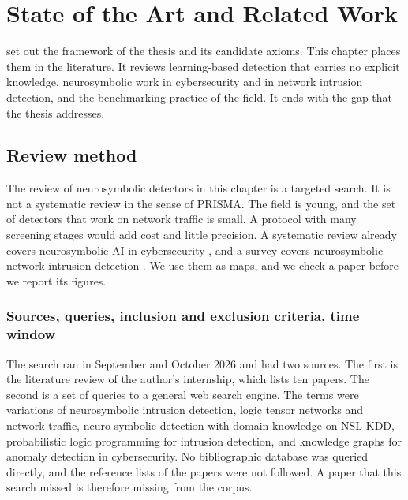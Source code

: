 \chapter{State of the Art and Related Work}
\label{ch:related-work}

 set out the framework of the thesis and its candidate axioms. This
chapter places them in the literature. It reviews learning-based
detection that carries no explicit knowledge, neurosymbolic work in
cybersecurity and in network intrusion detection, and the benchmarking
practice of the field. It ends with the gap that the thesis addresses.

\section{Review method}
\label{sec:review-method}

The review of neurosymbolic detectors in this chapter is a targeted search. It
is not a systematic review in the sense of PRISMA. The field is young, and the
set of detectors that work on network traffic is small. A protocol with many
screening stages would add cost and little precision. A systematic review
already covers neurosymbolic AI in cybersecurity
\citep{hakim2025nesycybersecurity}, and a survey covers neurosymbolic network
intrusion detection \citep{bizzarri2025survey}. We use them as maps, and we check a paper before we
report its figures.

\subsection{Sources, queries, inclusion and exclusion criteria, time window}
\label{sec:review-sources}

The search ran in September and October 2026 and had two sources. The first is
the literature review of the author's internship, which lists ten papers. The
second is a set of queries to a general web search engine. The terms were
variations of neurosymbolic intrusion detection, logic tensor networks and
network traffic, neuro-symbolic detection with domain knowledge on NSL-KDD,
probabilistic logic programming for intrusion detection, and knowledge graphs
for anomaly detection in cybersecurity. No bibliographic database was queried
directly, and the reference lists of the papers were not followed. A paper that
this search missed is therefore missing from the corpus.

